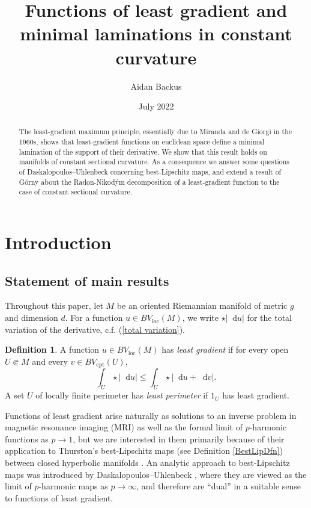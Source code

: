 \documentclass[reqno,10pt]{amsart}
\title{Functions of least gradient and minimal laminations in constant curvature}
\author{Aidan Backus}
\date{July 2022}
\newcommand*\dif{\mathop{}\!\mathrm{d}}
\newcommand{\dfn}[1]{\emph{#1}\index{#1}}
\newcommand{\loc}{\mathrm{loc}}
\newcommand{\cpt}{\mathrm{cpt}}
\theoremstyle{definition}
\newtheorem{definition}[theorem]{Definition}
\numberwithin{equation}{section}
\begin{document}
\begin{abstract}
The least-gradient maximum principle, essentially due to Miranda and de Giorgi in the 1960s, shows that least-gradient functions on euclidean space define a minimal lamination of the support of their derivative.
We show that this result holds on manifolds of constant sectional curvature.
As a consequence we answer some questions of Daskalopoulos--Uhlenbeck concerning best-Lipschitz maps, and extend a result of G\'orny about the Radon-Nikod\'ym decomposition of a least-gradient function to the case of constant sectional curvature.
\end{abstract}

\maketitle



\section{Introduction}
\subsection{Statement of main results}
Throughout this paper, let $M$ be an oriented Riemannian manifold of metric $g$ and dimension $d$.
For a function $u \in BV_\loc(M)$, we write $\star |\dif u|$ for the total variation of the derivative, c.f. (\ref{total variation}).

\begin{definition}\label{main definitions}
A function $u \in BV_\loc(M)$ has \dfn{least gradient} if for every open $U \Subset M$ and every $v \in BV_\cpt(U)$,
$$\int_U \star |\dif u| \leq \int_U \star |\dif u + \dif v|.$$
A set $U$ of locally finite perimeter has \dfn{least perimeter} if $1_U$ has least gradient.
\end{definition}

Functions of least gradient arise naturally as solutions to an inverse problem in magnetic resonance imaging (MRI) \cite{Nachman2009, Tamasan2019, Joy09} as well as the formal limit of $p$-harmonic functions as $p \to 1$, but we are interested in them primarily because of their application to Thurston's best-Lipschitz maps (see Definition \ref{BestLipDfn}) between closed hyperbolic manifolds \cite{thurston1998minimal}.
An analytic approach to best-Lipschitz maps was introduced by Daskalopoulos--Uhlenbeck \cite{daskalopoulos2020transverse, daskalopoulosPrep1}, where they are viewed as the limit of $p$-harmonic maps as $p \to \infty$, and therefore are ``dual'' in a suitable sense to functions of least gradient.
\end{document}

